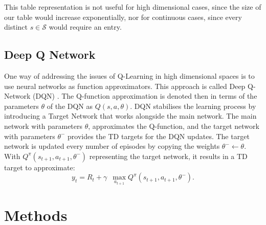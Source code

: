 \documentclass[a4paper, conference]{IEEEtran}
\begin{document}
This table representation is not useful for high dimensional cases, since the size of our table would increase exponentially, nor for continuous cases, since every distinct $s\in\mathcal{S}$ would require an entry.


\subsection{Deep Q Network}
One way of addressing the issues of Q-Learning in high dimensional spaces is to use neural networks as function approximators. This approach is called Deep Q-Network (DQN) \cite{mnih2015}.
The Q-function approximation is denoted then in terms of the parameters $\theta$ of the DQN as $Q(s,a,\theta)$.
DQN stabilises the learning process by introducing a Target Network that works alongside the main network. 
The main network with parameters $\theta$, approximates the Q-function, and the target network with parameters $\theta^-$  provides the TD targets for the DQN updates. 
The target network is updated every number of episodes by copying the weights $\theta^- \leftarrow \theta$. With $Q^{\pi} (s_{t+1}, a_{t+1}, \theta^-)$ representing the target network, it results in a TD target to approximate:
\begin{equation}
y_t = R_t + \gamma \,\,\, \max_{a_{t+1}} Q^{\pi} (s_{t+1}, a_{t+1}, \theta^-).
\end{equation}
\section{Methods}
\label{methods}
\end{document}
